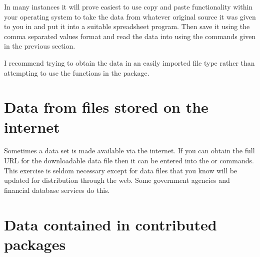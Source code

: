 In many instances it will prove easiest to use copy and paste functionality within your operating system to take the data from whatever original source it was given to you in and put it into a suitable spreadsheet program. Then save it using the comma separated values format and read the data into \R{} using the commands given in the previous section. 
 
I recommend trying to obtain the data in an easily imported file type rather than attempting to use the functions in the  package. 
 
\section{Data from files stored on the internet} 
 
Sometimes a data set is made available via the internet. If you can obtain the full URL for the downloadable data file then it can be entered into the  or  commands. This exercise is seldom necessary except for data files that you know will be updated for distribution through the web. Some government agencies and financial database services do this. 
 
\section{Data contained in contributed packages} 
\label{DataFromPackages} 
 
